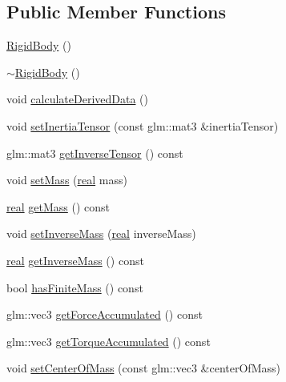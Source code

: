 \subsection*{Public Member Functions}
\begin{DoxyCompactItemize}
\item 
\mbox{\hyperlink{classrum_1_1_rigid_body_ae1efd6c0e714636693c8e476b39565b4}{Rigid\+Body}} ()
\item 
\mbox{\hyperlink{classrum_1_1_rigid_body_ad14fd1ea1e482143ad982675a63517fd}{$\sim$\+Rigid\+Body}} ()
\item 
void \mbox{\hyperlink{classrum_1_1_rigid_body_a3f14dfc9bb7dcfc961373b8f7cb71dc9}{calculate\+Derived\+Data}} ()
\item 
void \mbox{\hyperlink{classrum_1_1_rigid_body_a15fd4045586f493df7611c7d362bff16}{set\+Inertia\+Tensor}} (const glm\+::mat3 \&inertia\+Tensor)
\item 
glm\+::mat3 \mbox{\hyperlink{classrum_1_1_rigid_body_a3b58d995c906e40954b616124195c07c}{get\+Inverse\+Tensor}} () const
\item 
void \mbox{\hyperlink{classrum_1_1_rigid_body_ae12c446bc4f73154e049ba176d89c6d8}{set\+Mass}} (\mbox{\hyperlink{namespacerum_a7e8cca23573d5eaead0f138cbaa4862c}{real}} mass)
\item 
\mbox{\hyperlink{namespacerum_a7e8cca23573d5eaead0f138cbaa4862c}{real}} \mbox{\hyperlink{classrum_1_1_rigid_body_a07818ed12a3e223b40191a5d934a2c94}{get\+Mass}} () const
\item 
void \mbox{\hyperlink{classrum_1_1_rigid_body_a2e6890fd82efab0d277eb3a0e899ad24}{set\+Inverse\+Mass}} (\mbox{\hyperlink{namespacerum_a7e8cca23573d5eaead0f138cbaa4862c}{real}} inverse\+Mass)
\item 
\mbox{\hyperlink{namespacerum_a7e8cca23573d5eaead0f138cbaa4862c}{real}} \mbox{\hyperlink{classrum_1_1_rigid_body_a4c1a53f80f22157d60037099bb54544a}{get\+Inverse\+Mass}} () const
\item 
bool \mbox{\hyperlink{classrum_1_1_rigid_body_a2f9a0176ad97d72081fce6f9724e52ea}{has\+Finite\+Mass}} () const
\item 
glm\+::vec3 \mbox{\hyperlink{classrum_1_1_rigid_body_a4ca360e3c321f79d604ae951ea6f0121}{get\+Force\+Accumulated}} () const
\item 
glm\+::vec3 \mbox{\hyperlink{classrum_1_1_rigid_body_a3df551fd59fe930491f573d9d9e4d1d4}{get\+Torque\+Accumulated}} () const
\item 
void \mbox{\hyperlink{classrum_1_1_rigid_body_acca155dcca1bcd56fde11a4cc23c9dea}{set\+Center\+Of\+Mass}} (const glm\+::vec3 \&center\+Of\+Mass)

\end{DoxyCompactItemize}
